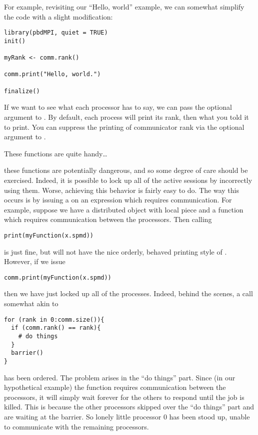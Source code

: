 For example, revisiting our ``Hello, world'' example, we can somewhat
simplify the code with a slight modification:

\begin{lstlisting}[language=rr,title=Simple pbdMPI Example 3]
library(pbdMPI, quiet = TRUE)
init()

myRank <- comm.rank()

comm.print("Hello, world.")

finalize()
\end{lstlisting}

If we want to see what each processor has to say, we can pass the optional
argument  to . By default, each process
will print its rank, then what you told it to print. You can suppress the
printing of communicator rank via the optional argument 
to .

These functions are quite handy\dots
\begin{center}
\colorbox{yellow}{\Huge \color{red}{\#\#\#\#\# HOWEVER \#\#\#\#\# }}  
\end{center}
these functions are potentially dangerous, and so some degree of care
should be exercised. Indeed, it is possible to lock up all of the
active  sessions by incorrectly using them. Worse, achieving
this behavior is fairly easy to do. The way this occurs is by issuing
a  on an expression which requires communication.
For example, suppose we have a distributed object with local piece
 and a function  which requires
communication between the processors. Then calling
\begin{lstlisting}[language=rr,title=A Cautionary Tale of Printing in Parallel (1 of 3)]
print(myFunction(x.spmd)) 
\end{lstlisting}
is just fine, but will not have the nice orderly, behaved printing style
of . However, if we issue
\begin{lstlisting}[language=rr,title=A Cautionary Tale of Printing in Parallel (2 of 3)]
comm.print(myFunction(x.spmd)) 
\end{lstlisting}
then we have just locked up all of the  processes. Indeed,
behind the scenes, a call somewhat akin to
\begin{lstlisting}[language=rr]
for (rank in 0:comm.size()){
  if (comm.rank() == rank){
    # do things
  }
  barrier()
}
\end{lstlisting}
has been ordered. The problem arises in the ``do things'' part. Since
(in our hypothetical example) the function  requires
communication between the processors, it will simply wait forever for
the others to respond until the job is killed. This is because the other
processors skipped over the ``do things'' part and are waiting at the barrier.
So lonely little processor 0 has been stood up, unable to communicate with
the remaining processors.


